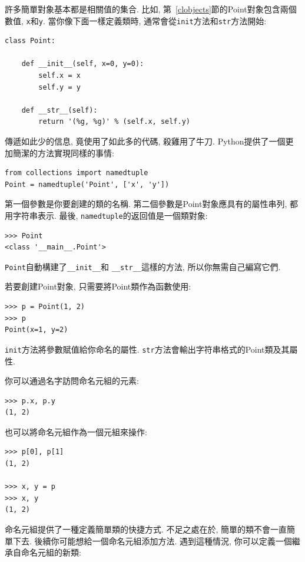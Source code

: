 \documentclass[10pt]{book}
\begin{document}
許多簡單對象基本都是相關值的集合. 
比如, 第~\ref{clobjects}節的Point對象包含兩個數值, {\tt x}和{\tt y}.
當你像下面一樣定義類時, 通常會從{\tt init}方法和{\tt str}方法開始:

\begin{verbatim}
class Point:

    def __init__(self, x=0, y=0):
        self.x = x
        self.y = y

    def __str__(self):
        return '(%g, %g)' % (self.x, self.y)
\end{verbatim}

傳遞如此少的信息, 竟使用了如此多的代碼, 殺雞用了牛刀. 
Python提供了一個更加簡潔的方法實現同樣的事情:

\begin{verbatim}
from collections import namedtuple
Point = namedtuple('Point', ['x', 'y'])
\end{verbatim}

第一個參數是你要創建的類的名稱. 
第二個參數是Point對象應具有的屬性串列, 都用字符串表示. 
最後, {\tt namedtuple}的返回值是一個類對象:

\begin{verbatim}
>>> Point
<class '__main__.Point'>
\end{verbatim}

{\tt Point}自動構建了\verb"__init__"和
\verb"__str__"這樣的方法, 所以你無需自己編寫它們. 

若要創建Point對象, 只需要將Point類作為函數使用:

\begin{verbatim}
>>> p = Point(1, 2)
>>> p
Point(x=1, y=2)
\end{verbatim}

{\tt init}方法將參數賦值給你命名的屬性. 
{\tt str}方法會輸出字符串格式的Point類及其屬性. 

你可以通過名字訪問命名元組的元素:

\begin{verbatim}
>>> p.x, p.y
(1, 2)
\end{verbatim}

也可以將命名元組作為一個元組來操作:

\begin{verbatim}
>>> p[0], p[1]
(1, 2)

>>> x, y = p
>>> x, y
(1, 2)
\end{verbatim}

命名元組提供了一種定義簡單類的快捷方式. 
不足之處在於, 簡單的類不會一直簡單下去. 
後續你可能想給一個命名元組添加方法. 
遇到這種情況, 你可以定義一個繼承自命名元組的新類:
\end{document}
